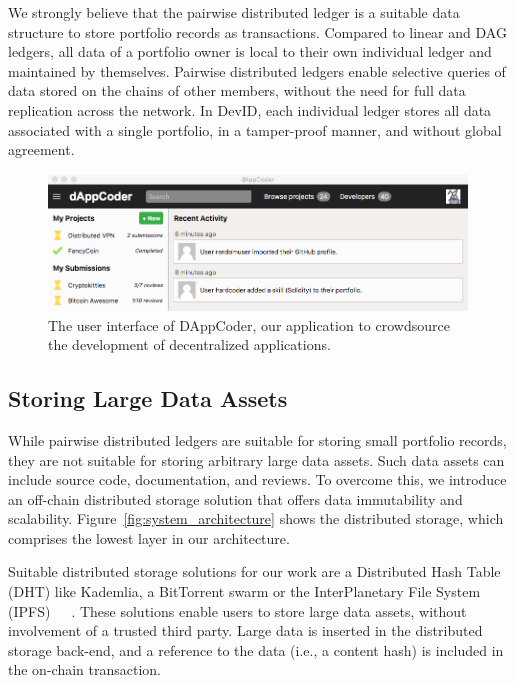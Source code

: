 We strongly believe that the pairwise distributed ledger is a suitable data structure to store portfolio records as transactions.
Compared to linear and DAG ledgers, all data of a portfolio owner is local to their own individual ledger and maintained by themselves.
Pairwise distributed ledgers enable selective queries of data stored on the chains of other members, without the need for full data replication across the network.
In DevID, each individual ledger stores all data associated with a single portfolio, in a tamper-proof manner, and without global agreement.

\begin{figure}[t!]
	\centering
	\includegraphics[width=0.99\textwidth]{devid/resources/gui_smaller.png}
	\caption{The user interface of DAppCoder, our application to crowdsource the development of decentralized applications.}
	\label{fig:dappcoder}
\end{figure}

\subsection{Storing Large Data Assets}
While pairwise distributed ledgers are suitable for storing small portfolio records, they are not suitable for storing arbitrary large data assets.
Such data assets can include source code, documentation, and reviews.
To overcome this, we introduce an off-chain distributed storage solution that offers data immutability and scalability.
Figure~\ref{fig:system_architecture} shows the distributed storage, which comprises the lowest layer in our architecture.

Suitable distributed storage solutions for our work are a Distributed Hash Table (DHT) like Kademlia, a BitTorrent swarm or the InterPlanetary File System (IPFS)~\cite{maymounkov2002kademlia}~\cite{cohen2008bittorrent}~\cite{benet2014ipfs}.
These solutions enable users to store large data assets, without involvement of a trusted third party.
Large data is inserted in the distributed storage back-end, and a reference to the data (i.e., a content hash) is included in the on-chain transaction.

